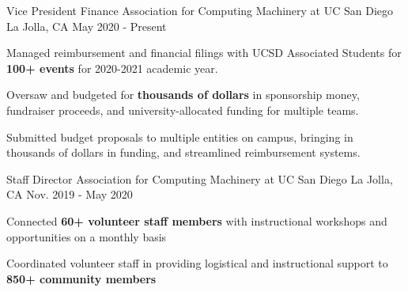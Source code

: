 
\begin{cventries}

  \cventry
    {Vice President Finance} %
    {Association for Computing Machinery at UC San Diego} %
    {La Jolla, CA} %
    {May 2020 - Present} %
    {
      \begin{cvitems} %
        \item {Managed reimbursement and financial filings with UCSD Associated Students for \textbf{100+ events} for 2020-2021 academic year.}
        \item {Oversaw and budgeted for \textbf{thousands of dollars} in sponsorship money, fundraiser proceeds, and university-allocated funding for multiple teams.}
        \item {Submitted budget proposals to multiple entities on campus, bringing in thousands of dollars in funding, and streamlined reimbursement systems.}
      \end{cvitems}
    }

  \cventry
    {Staff Director} %
    {Association for Computing Machinery at UC San Diego} %
    {La Jolla, CA} %
    {Nov. 2019 - May 2020} %
    {
      \begin{cvitems} %
        \item {Connected \textbf{60+ volunteer staff members} with instructional workshops and opportunities on a monthly basis}
        \item {Coordinated volunteer staff in providing logistical and instructional support to \textbf{850+ community members}}
      \end{cvitems}
    }


\end{cventries}
